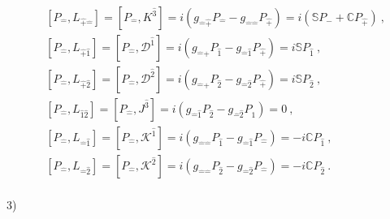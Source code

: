 \documentclass[12pt,a4paper]{report}
\begin{document}
\begin{align*}
    &\left[P_{\hat{-}},L_{\hat{+}\hat{-}}\right]=\left[P_{\hat{-}},K^{\hat{3}}\right]=i\left(g_{\hat{-}\hat{+}}P_{\hat{-}}-g_{\hat{-}\hat{-}}P_{\hat{+}}\right)=i\left(\mathbb{S}P_{\hat{-}}+\mathbb{C}P_{\hat{+}}\right)~,\\
    &\left[P_{\hat{-}},L_{\hat{+}\hat{1}}\right]=\left[P_{\hat{-}},\mathcal{D}^\hat{1}\right]=i\left(g_{\hat{-}\hat{+}}P_{\hat{1}}-g_{\hat{-}\hat{1}}P_{\hat{+}}\right)=i\mathbb{S}P_{\hat{1}}~,\\
    &\left[P_{\hat{-}},L_{\hat{+}\hat{2}}\right]=\left[P_{\hat{-}},\mathcal{D}^\hat{2}\right]=i\left(g_{\hat{-}\hat{+}}P_{\hat{2}}-g_{\hat{-}\hat{2}}P_{\hat{+}}\right)=i\mathbb{S}P_{\hat{2}}~,\\
    &\left[P_{\hat{-}},L_{\hat{1}\hat{2}}\right]=\left[P_{\hat{-}},J^\hat{3}\right]=i\left(g_{\hat{-}\hat{1}}P_{\hat{2}}-g_{\hat{-}\hat{2}}P_{\hat{1}}\right)=0~,\\
    &\left[P_{\hat{-}},L_{\hat{-}\hat{1}}\right]=\left[P_{\hat{-}},\mathcal{K}^\hat{1}\right]=i\left(g_{\hat{-}\hat{-}}P_{\hat{1}}-g_{\hat{-}\hat{1}}P_{\hat{-}}\right)=-i\mathbb{C}P_{\hat{1}}~,\\
    &\left[P_{\hat{-}},L_{\hat{-}\hat{2}}\right]=\left[P_{\hat{-}},\mathcal{K}^\hat{2}\right]=i\left(g_{\hat{-}\hat{-}}P_{\hat{2}}-g_{\hat{-}\hat{2}}P_{\hat{-}}\right)=-i\mathbb{C}P_{\hat{2}}~.
\end{align*}\\
3) 
\end{document}
